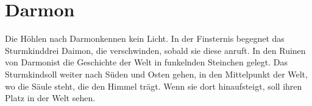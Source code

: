 \documentclass[12pt,a4paper,onecolumn,twoside,ngerman]{book}
\newcommand{\Sturmkind}{Sturmkind}
\newcommand{\Daimon}{Daimon}
\newcommand{\Darmon}{Darmon}
\begin{document}
\section{\Darmon}
Die Höhlen nach \Darmon kennen kein Licht. In der Finsternis begegnet das \Sturmkind drei \Daimon, die verschwinden, sobald sie diese anruft.
In den Ruinen von \Darmon ist die Geschichte der Welt in funkelnden Steinchen gelegt. Das \Sturmkind soll weiter nach Süden und Osten gehen, in den Mittelpunkt der Welt, wo die Säule steht, die den Himmel trägt. Wenn sie dort hinaufsteigt, soll ihren Platz in der Welt sehen.
\end{document}
